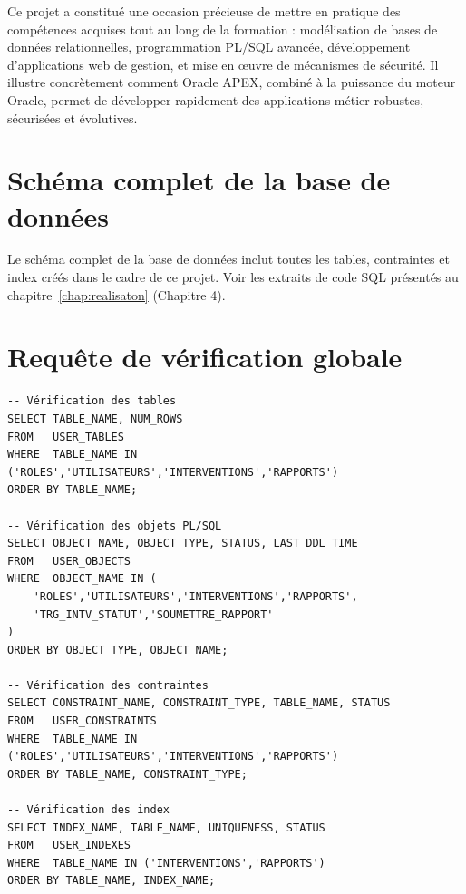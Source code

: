 \documentclass[12pt,a4paper,oneside]{report}
\begin{document}
\medskip

Ce projet a constitué une occasion précieuse de mettre en pratique des compétences acquises tout au long de la formation : modélisation de bases de données relationnelles, programmation PL/SQL avancée, développement d'applications web de gestion, et mise en œuvre de mécanismes de sécurité. Il illustre concrètement comment Oracle APEX, combiné à la puissance du moteur Oracle, permet de développer rapidement des applications métier robustes, sécurisées et évolutives.

\printbibliography[heading=bibintoc,title={Bibliographie}]

\appendix
\chapter{Schéma complet de la base de données}
\label{ann:schema}

Le schéma complet de la base de données inclut toutes les tables, contraintes et index créés dans le cadre de ce projet. Voir les extraits de code SQL présentés au chapitre~\ref{chap:realisaton} (Chapitre 4).

\chapter{Requête de vérification globale}
\label{ann:verify}

\begin{lstlisting}[language=PLSQL, caption=Vérification de l'état de tous les objets du schéma]
-- Vérification des tables
SELECT TABLE_NAME, NUM_ROWS
FROM   USER_TABLES
WHERE  TABLE_NAME IN ('ROLES','UTILISATEURS','INTERVENTIONS','RAPPORTS')
ORDER BY TABLE_NAME;

-- Vérification des objets PL/SQL
SELECT OBJECT_NAME, OBJECT_TYPE, STATUS, LAST_DDL_TIME
FROM   USER_OBJECTS
WHERE  OBJECT_NAME IN (
    'ROLES','UTILISATEURS','INTERVENTIONS','RAPPORTS',
    'TRG_INTV_STATUT','SOUMETTRE_RAPPORT'
)
ORDER BY OBJECT_TYPE, OBJECT_NAME;

-- Vérification des contraintes
SELECT CONSTRAINT_NAME, CONSTRAINT_TYPE, TABLE_NAME, STATUS
FROM   USER_CONSTRAINTS
WHERE  TABLE_NAME IN ('ROLES','UTILISATEURS','INTERVENTIONS','RAPPORTS')
ORDER BY TABLE_NAME, CONSTRAINT_TYPE;

-- Vérification des index
SELECT INDEX_NAME, TABLE_NAME, UNIQUENESS, STATUS
FROM   USER_INDEXES
WHERE  TABLE_NAME IN ('INTERVENTIONS','RAPPORTS')
ORDER BY TABLE_NAME, INDEX_NAME;
\end{lstlisting}
\end{document}
